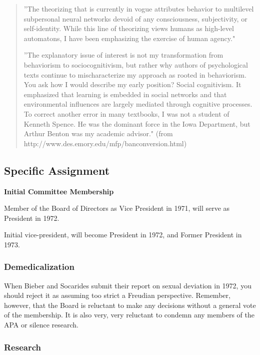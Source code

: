 \begin{refsection}
\begin{quote}
”The theorizing that is currently in vogue attributes behavior to multilevel subpersonal neural networks devoid of any consciousness, subjectivity, or self-identity. While this line of theorizing views humans as high-level automatons, I have been emphasizing the exercise of human agency."

”The explanatory issue of interest is not my transformation from behaviorism to sociocognitivism, but rather why authors of psychological texts continue to mischaracterize my approach as rooted in behaviorism. You ask how I would describe my early position? Social cognitivism. It emphasized that learning is embedded in social networks and that environmental influences are largely mediated through cognitive processes. To correct another error in many textbooks, I was not a student of Kenneth Spence. He was the dominant force in the Iowa Department, but Arthur Benton was my academic advisor." (from http:\slash \slash www.des.emory.edu\slash mfp\slash banconversion.html)
\end{quote}

\subsection{Specific Assignment}
\label{specificassignment}

\textbf{Initial Committee Membership}
\begin{service}[Bandura]\label{service:bandura}
Member of the Board of Directors as Vice President in 1971, will serve as President in 1972.
\end{service}

Initial vice-president, will become President in 1972, and Former President in 1973.

\subsubsection{Demedicalization}
\label{demedicalization}

When Bieber and Socarides submit their report on sexual deviation in 1972, you should reject it as assuming too strict a Freudian perspective. Remember, however, that the Board is reluctant to make any decisions without a general vote of the membership. It is also very, very reluctant to condemn any members of the APA or silence research.

\subsubsection{Research}
\label{research}


\end{refsection}
